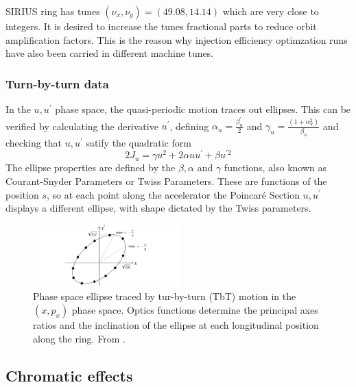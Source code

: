 SIRIUS ring has tunes $(\nu_x, \nu_y)=(49.08, 14.14)$ which are very close to integers. It is desired to increase the tunes fractional parts to reduce orbit amplification factors. This is the reason why injection efficiency optimzation runs have also been carried in different machine tunes.
\subsubsection{Turn-by-turn data}
In the $u, u^\prime$ phase space, the quasi-periodic motion traces out ellipses. This can be verified by calculating the derivative $u^\prime$, defining $\alpha_u = \frac{\beta_u^\prime}{2}$  and $\gamma_u = \frac{(1+\alpha_u^2)}{\beta_u}$ and checking that $u, u^\prime$ satify the quadratic form
        $$2J_u=\gamma u^{2}+2\alpha u u^{\prime}+\beta u^{\prime2}$$
The ellipse properties are defined by the $\beta, \alpha$ and $\gamma$ functions, also known as Courant-Snyder Parameters or Twiss Parameters. These are functions of the position $s$, so at each point along the accelerator the Poincaré Section $u, u^\prime$ displays a different ellipse, with shape dictated by the Twiss parameters.
\begin{figure}[htb]
    \centering
    \includegraphics[width=0.5\textwidth]{Images/ellipse}
    \caption{Phase space ellipse traced by tur-by-turn (TbT) motion in the $(x,p_x)$ phase space. Optics functions determine the principal axes ratios and the inclination of the ellipse at each longitudinal position along the ring. From \cite{wolski2014beam}.}
    \label{ellipse}
\end{figure}
\subsection{Chromatic effects}
